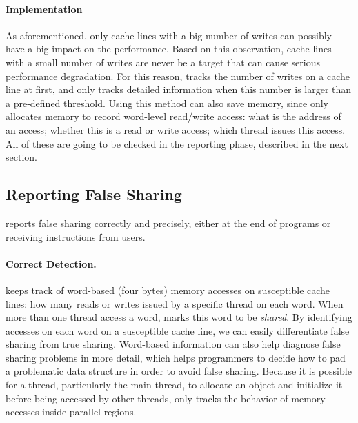 
\paragraph{Implementation} 
As aforementioned, only cache lines with a big number of writes can possibly have a big impact on the performance. Based on this observation, cache lines with a small number of writes are never be a target that can cause serious performance degradation. For this reason, \Cheetah{} tracks the number of writes on a cache line at first, and only tracks detailed information when this number is larger than a pre-defined threshold. Using this method can also save memory, since \cheetah{} only allocates memory to record word-level read/write access: what is the address of an access; whether this is a read or write access; which thread issues this access. All of these are going to be checked in the reporting phase, described in the next section. 

 \subsection{Reporting False Sharing}
\label{sec:report}

\Cheetah{} reports false sharing correctly and precisely, either at the end of programs or receiving instructions from users.  

\paragraph{Correct Detection.} \Cheetah{} keeps track of word-based (four bytes) memory accesses on susceptible cache lines: how many reads or writes issued by a specific thread on each word. When more than one thread access a word, \Cheetah{} marks this word to be \emph{shared}. By identifying accesses on each word on a susceptible cache line, we can easily differentiate false sharing from true sharing. Word-based information can also help diagnose false sharing problems in more detail, which helps programmers to decide how to pad a problematic data structure in order to avoid false sharing. Because it is possible for a thread, particularly the main thread, to allocate an object and initialize it before being accessed by other threads, \cheetah{} only tracks the behavior of memory accesses inside parallel regions.

